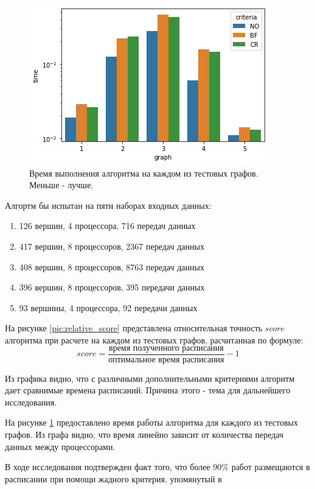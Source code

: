 \begin{figure}[H]
    \includegraphics{imgs/times.png}
    \caption{Время выполнения алгоритма на каждом из тестовых графов. Меньше - лучше.}
    \label{pic:times}
\end{figure}

Алгортм бы испытан на пяти наборах входных данных:
\begin{enumerate}
    \item 126 вершин, 4 процессора, 716 передач данных
    \item 417 вершин, 8 процессоров, 2367 передач данных
    \item 408 вершин, 8 процессоров, 8763 передач данных
    \item 396 вершин, 8 процессоров, 395 передачи данных
    \item 93 вершины, 4 процессора, 92 передачи данных
\end{enumerate}

На рисунке \ref{pic:relative_score} представлена относительная точность $score$ алгоритма при расчете на каждом из тестовых графов, расчитанная по формуле:
\begin{equation*}
    score = \frac{\text{время полученного расписания}}{\text{оптимальное время расписания}} - 1
\end{equation*}

Из графика видно, что с различными дополнительными критериями алгоритм дает сравнимые времена расписаний. Причина этого - тема для дальнейшего исследования.

На рисунке \ref{pic:times} предоставлено время работы алгоритма для каждого из тестовых графов. Из графа видно, что время линейно зависит от количества передач данных между процессорами. 

В ходе исследования подтвержден факт того, что более $90\%$ работ размещаются в расписании при помощи жадного критерия, упомянутый в \cite{Kostenko_2017}